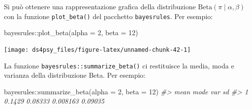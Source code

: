 \documentclass[
  11pt,
]{krantz}
\makeatletter
\newenvironment{Shaded}{\begin{snugshade}}{\end{snugshade}}
\newcommand{\AttributeTok}[1]{\textcolor[rgb]{0.61,0.61,0.61}{#1}}
\newcommand{\CommentTok}[1]{\textcolor[rgb]{0.37,0.37,0.37}{\textit{#1}}}
\newcommand{\DecValTok}[1]{\textcolor[rgb]{0.06,0.06,0.06}{#1}}
\newcommand{\FunctionTok}[1]{\textcolor[rgb]{0,0,0}{#1}}
\newcommand{\NormalTok}[1]{#1}
\newcommand{\SpecialCharTok}[1]{\textcolor[rgb]{0,0,0}{#1}}
\newenvironment{kframe}{%
\medskip{}
\setlength{\fboxsep}{.8em}
 \def\at@end@of@kframe{}%
 \ifinner\ifhmode%
  \def\at@end@of@kframe{\end{minipage}}%
  \begin{minipage}{\columnwidth}%
 \fi\fi%
 \def\FrameCommand##1{\hskip\@totalleftmargin \hskip-\fboxsep
 \colorbox{shadecolor}{##1}\hskip-\fboxsep
     \hskip-\linewidth \hskip-\@totalleftmargin \hskip\columnwidth}%
 \MakeFramed {\advance\hsize-\width
   \@totalleftmargin\z@ \linewidth\hsize
   \@setminipage}}%
 {\par\unskip\endMakeFramed%
 \at@end@of@kframe}
\renewenvironment{Shaded}{\begin{kframe}}{\end{kframe}}
\theoremstyle{definition}
\theoremstyle{definition}
\theoremstyle{definition}
\theoremstyle{definition}
\theoremstyle{remark}
\makeatother
\begin{document}
Si può ottenere una rappresentazione grafica della distribuzione \(\mbox{Beta}(\pi \mid \alpha, \beta)\) con la funzione \texttt{plot\_beta()} del pacchetto \texttt{bayesrules}. Per esempio:

\begin{Shaded}
\begin{Highlighting}[]
\NormalTok{bayesrules}\SpecialCharTok{::}\FunctionTok{plot\_beta}\NormalTok{(}\AttributeTok{alpha =} \DecValTok{2}\NormalTok{, }\AttributeTok{beta =} \DecValTok{12}\NormalTok{)}
\end{Highlighting}
\end{Shaded}

\begin{center}\texttt{[image: ds4psy\_files/figure-latex/unnamed-chunk-42-1]} \end{center}

La funzione \texttt{bayesrules::summarize\_beta()} ci restituisce la media, moda e varianza della distribuzione Beta. Per esempio:

\begin{Shaded}
\begin{Highlighting}[]
\NormalTok{bayesrules}\SpecialCharTok{::}\FunctionTok{summarize\_beta}\NormalTok{(}\AttributeTok{alpha =} \DecValTok{2}\NormalTok{, }\AttributeTok{beta =} \DecValTok{12}\NormalTok{)}
\CommentTok{\#\textgreater{}     mean    mode      var      sd}
\CommentTok{\#\textgreater{} 1 0.1429 0.08333 0.008163 0.09035}
\end{Highlighting}
\end{Shaded}
\end{document}
